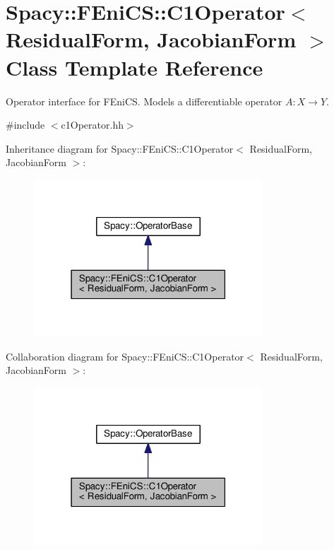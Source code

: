 \hypertarget{classSpacy_1_1FEniCS_1_1C1Operator}{}\section{Spacy\+:\+:F\+Eni\+CS\+:\+:C1\+Operator$<$ Residual\+Form, Jacobian\+Form $>$ Class Template Reference}
\label{classSpacy_1_1FEniCS_1_1C1Operator}


Operator interface for F\+Eni\+CS. Models a differentiable operator $A:X\rightarrow Y$.  




{\ttfamily \#include $<$c1\+Operator.\+hh$>$}



Inheritance diagram for Spacy\+:\+:F\+Eni\+CS\+:\+:C1\+Operator$<$ Residual\+Form, Jacobian\+Form $>$\+:
\nopagebreak
\begin{figure}[H]
\begin{center}
\leavevmode
\includegraphics[width=243pt]{classSpacy_1_1FEniCS_1_1C1Operator__inherit__graph}
\end{center}
\end{figure}


Collaboration diagram for Spacy\+:\+:F\+Eni\+CS\+:\+:C1\+Operator$<$ Residual\+Form, Jacobian\+Form $>$\+:
\nopagebreak
\begin{figure}[H]
\begin{center}
\leavevmode
\includegraphics[width=243pt]{classSpacy_1_1FEniCS_1_1C1Operator__coll__graph}
\end{center}
\end{figure}
